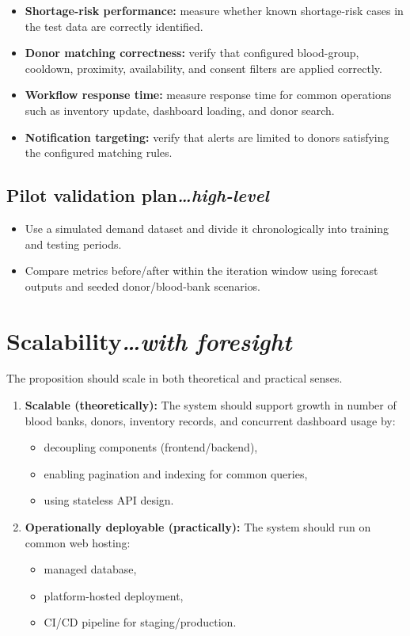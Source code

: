 \documentclass[11pt]{article}
\newcommand{\secnote}[2]{\section{#1\hfill\normalfont\normalsize\itshape #2}}
\newcommand{\subsecnote}[2]{\subsection{#1\hfill\normalfont\normalsize\itshape #2}}
\begin{document}
\begin{itemize}
\item \textbf{Shortage-risk performance:} measure whether known shortage-risk cases in the test data
are correctly identified.
\item \textbf{Donor matching correctness:} verify that configured blood-group, cooldown, proximity,
availability, and consent filters are applied correctly.
\item \textbf{Workflow response time:} measure response time for common operations such as inventory update, dashboard loading, and donor search.
\item \textbf{Notification targeting:} verify that alerts are limited to donors satisfying the configured
matching rules.
\end{itemize}

\subsecnote{Pilot validation plan}{\ldots high-level}

\begin{itemize}
\item Use a simulated demand dataset and divide it chronologically into training and testing
periods.
\item Compare metrics before/after within the iteration window using forecast outputs and seeded
donor/blood-bank scenarios.
\end{itemize}

\secnote{Scalability}{\ldots with foresight}

The proposition should scale in both theoretical and practical senses.

\begin{enumerate}
\item \textbf{Scalable (theoretically):} The system should support growth in number of blood banks,
donors, inventory records, and concurrent dashboard usage by:
\begin{itemize}
\item decoupling components (frontend/backend),
\item enabling pagination and indexing for common queries,
\item using stateless API design.
\end{itemize}
\item \textbf{Operationally deployable (practically):} The system should run on common web hosting:
\begin{itemize}
\item managed database,
\item platform-hosted deployment,
\item CI/CD pipeline for staging/production.
\end{itemize}
\end{enumerate}
\end{document}

